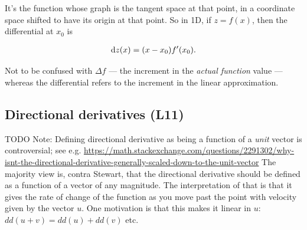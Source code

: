 It's the function whose graph is the tangent space at that point, in a
coordinate space shifted to have its origin at that point. So in 1D, if
$z = f(x)$, then the differential at $x_0$ is

\begin{align*}
  \dz(x) = (x - x_0)f'(x_0).
\end{align*}


Not to be confused with $\Delta f$ --- the increment in the \textit{actual
  function} value --- whereas the differential refers to the increment in the
linear approximation.


\subsection{Directional derivatives (L11)}

TODO Note: Defining directional derivative as being a function of a \textit{unit} vector is
controversial; see
e.g. \url{https://math.stackexchange.com/questions/2291302/why-isnt-the-directional-derivative-generally-scaled-down-to-the-unit-vector}
The majority view is, contra Stewart, that the directional derivative should be defined as a
function of a vector of any magnitude. The interpretation of that is that it gives the rate of
change of the function as you move past the point with velocity given by the vector $u$. One
motivation is that this makes it linear in $u$: $dd(u + v) = dd(u) + dd(v)$ etc.



